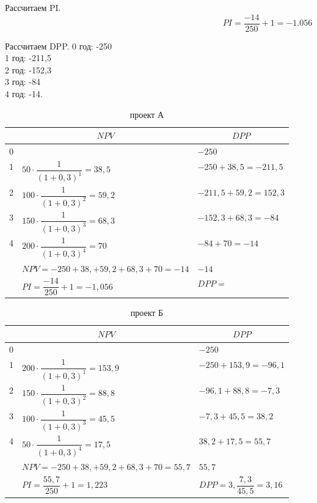 Рассчитаем PI.
\[PI = \dfrac{-14}{250}+1=-1.056\]

Рассчитаем DPP.
0 год: -250\\
1 год: -211,5\\
2 год: -152,3\\
3 год: -84\\
4 год: -14.

\begin{table}[]
	\caption{проект А}
	\small
	\setlength{\extrarowheight}{2.7mm}
		\begin{tabularx}{\textwidth}{|K{1.55cm}|p{5cm}|p{5cm}|}
		\hline
		&                       &  \\  &                                                                    &  $    -250   $                 \\  & $50 \cdot \dfrac{1}{(1+0,3)^1} = 38,5$  &$ -250 +38,5   = -211,5     $            \\  & $100 \cdot \dfrac{1}{(1+0,3)^2} = 59,2$ & $-211,5  +59,2=152,3      $           \\  & $150 \cdot \dfrac{1}{(1+0,3)^3} = 68,3$ &$-152,3  +68,3=-84    $             \\  & $200 \cdot \dfrac{1}{(1+0,3)^4} = 70$  & $-84 +70= -14     $                \\ \hline
		&$NPV = -250+38,+59,2+68,3+70=-14$     & $-14 $                     \\ \hline
		&$PI = \dfrac{-14}{250}+1=-1,056$                                        & $DPP = $                 \\ \hline
		\end{tabularx}
		\end{table}

\begin{table}[!h]
	\caption{проект Б}
	\small
	\setlength{\extrarowheight}{2.7mm}
	\begin{tabularx}{\textwidth}{|K{1.55cm}|p{5cm}|p{5cm}|}
		\hline
		&                       &  \\  &                                                                    &  $    -250   $                 \\  & $200 \cdot \dfrac{1}{(1+0,3)^1} = 153,9$  &$ -250 +153,9   = -96,1     $            \\  & $150 \cdot \dfrac{1}{(1+0,3)^2} = 88,8$ & $-96,1  +88,8=-7,3      $           \\  & $100 \cdot \dfrac{1}{(1+0,3)^3} = 45,5$ &$-7,3  +45,5=38,2    $             \\  & $50 \cdot \dfrac{1}{(1+0,3)^4} =17,5$  & $38,2 +17,5= 55,7     $                \\ \hline
		&$NPV = -250+38,+59,2+68,3+70=55,7$     & $55,7 $                     \\ \hline
		&$PI = \dfrac{55,7}{250}+1=1,223$                                        & $DPP = 3,\dfrac{7,3}{45,5}=3,16$                 \\ \hline
	\end{tabularx}
\end{table}

